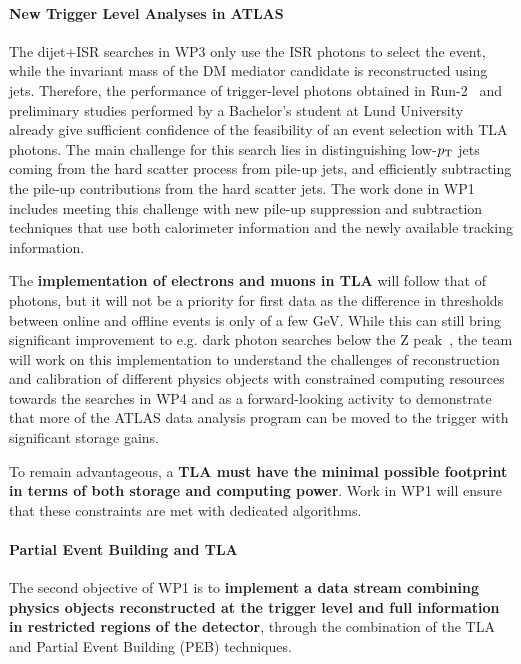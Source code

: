 \paragraph{New Trigger Level Analyses in ATLAS}



The dijet+ISR searches in WP3 only use the ISR photons to select the event, while the invariant mass of the DM mediator candidate is reconstructed using jets. Therefore, the performance of trigger-level photons obtained in Run-2~\cite{EgammaTriggerPaper} and preliminary studies performed by a Bachelor’s student at Lund University~\cite{LeoThesis} already give sufficient confidence of the feasibility of an event selection with TLA photons. 
The main challenge for this search lies in distinguishing low-$p_{\rm{T}}$ jets coming from the hard scatter process from pile-up jets, and efficiently subtracting the pile-up contributions from the hard scatter jets. 
The work done in WP1 includes meeting this challenge with new pile-up suppression and subtraction techniques that use both calorimeter information and the newly available tracking information. 

The \textbf{implementation of electrons and muons in TLA} will follow that of photons, but it will not be a priority for first data as the difference in thresholds between online and offline events is only of a few GeV. While this can still bring significant improvement to e.g. dark photon searches below the Z peak~\cite{CMSDimuon}, the team will work on this implementation to understand the challenges of reconstruction and calibration of different physics objects with constrained computing resources towards the searches in WP4 and as a forward-looking activity to demonstrate that more of the ATLAS data analysis program can be moved to the trigger with significant storage gains. 

To remain advantageous, a \textbf{TLA must have the minimal possible footprint in terms of both storage and computing power}. Work in WP1 will ensure that these constraints are met with dedicated algorithms.  

\paragraph{Partial Event Building and TLA}

The second objective of WP1 is to \textbf{implement a data stream combining physics objects reconstructed at the trigger level and full information in restricted regions of the detector}, through the combination of the TLA and Partial Event Building (PEB) techniques. 

